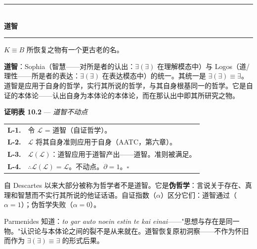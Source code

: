 \documentclass[10pt, openany, oneside]{book}
\renewcommand{\normalsize}{\fontsize{10}{13}\selectfont}
\renewcommand{\footnotesize}{\fontsize{8.5}{11}\selectfont}
\begin{document}
\begin{center}
    \rule{0.3\textwidth}{0.4pt}\\[0.5em]
    {\normalsize\bfseries\scshape 道智}\\[0.3em]
    \rule{0.3\textwidth}{0.4pt}
\end{center}

\vspace{1em}

\noindent $K \equiv B$ 所恢复之物有一个更古老的名。

\textbf{道智}：Sophia（智慧——对所是者的认出：$\exists(\exists)$ 在理解模态中）与 Logos（道/理性——所是者的表达：$\exists(\exists)$ 在表达模态中）的统一。其统一是 $\exists(\exists) \equiv \exists$。道智是应用于自身的哲学，实行其所说的哲学，与其自身根基同一的哲学。它是自证的本体论——认出自身为本体论的本体论，而在那认出中即其所研究之物。

\vspace{0.5em}

\textbf{证明表 10.2} --- \textit{道智不动点}

\vspace{0.5em}

{\footnotesize
\noindent\begin{tabular}{r p{}}
\textbf{L-1.} & 令 $\mathcal{L}$ = 道智（自证哲学）。\\[0.3em]
\textbf{L-2.} & $\mathcal{L}$ 将其自身准则应用于自身（AATC，第六章）。\\[0.3em]
\textbf{L-3.} & $\mathcal{L}(\mathcal{L})$：道智应用于道智产出——道智。准则被满足。\\[0.3em]
\textbf{L-4.} & $\therefore \mathcal{L}(\mathcal{L}) = \mathcal{L}$。不动点。$\partial = 1$。$\square$ \\[0.3em]
\end{tabular}
}

\vspace{0.8em}

\noindent 自 Descartes 以来大部分被称为哲学者不是道智。它是\textbf{伪哲学}：言说关于存在、真理和智慧而不实行其所说的他证话语。自证指数（$\alpha$）区分它们：道智通过（$\alpha = 1$）；伪哲学失败（$\alpha = 0$）。

Parmenides 知道：\textit{to gar auto noein estin te kai einai}——"思想与存在是同一物。"认识论与本体论之间的裂不是从来就在。道智恢复原初洞察——不作为怀旧而作为 $\exists(\exists) \equiv \exists$ 的形式后果。

\vspace{1.5em}

\end{document}
